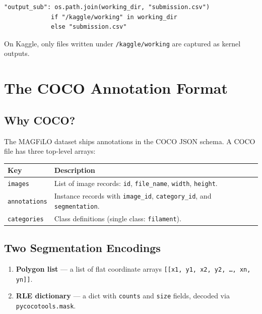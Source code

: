 \documentclass[11pt,a4paper,openany]{report}
\begin{document}
\begin{lstlisting}[caption={Conditional submission path},label={lst:subpath}]
"output_sub": os.path.join(working_dir, "submission.csv")
             if "/kaggle/working" in working_dir
             else "submission.csv"
\end{lstlisting}

On Kaggle, only files written under \texttt{/kaggle/working} are captured as kernel outputs.

\chapter{The COCO Annotation Format}

\section{Why COCO?}

The MAGFiLO dataset ships annotations in the COCO JSON schema. A COCO file has three
top-level arrays:

\begin{center}
\renewcommand{\arraystretch}{1.3}
\begin{tabular}{l p{10cm}}
\toprule
\textbf{Key} & \textbf{Description} \\
\midrule
\texttt{images} & List of image records: \texttt{id}, \texttt{file\_name}, \texttt{width}, \texttt{height}. \\
\texttt{annotations} & Instance records with \texttt{image\_id}, \texttt{category\_id}, and \texttt{segmentation}. \\
\texttt{categories} & Class definitions (single class: \texttt{filament}). \\
\bottomrule
\end{tabular}
\end{center}

\section{Two Segmentation Encodings}

\begin{enumerate}
  \item \textbf{Polygon list} --- a list of flat coordinate arrays
        \texttt{[[x1, y1, x2, y2, \ldots, xn, yn]]}.
  \item \textbf{RLE dictionary} --- a dict with \texttt{counts} and \texttt{size} fields, decoded via
        \texttt{pycocotools.mask}.
\end{enumerate}
\end{document}

